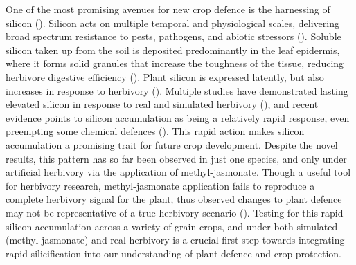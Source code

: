 \documentclass[12pt, letterpaper, ]{report}
\begin{document}
One of the most promising avenues for new crop defence is the harnessing of silicon (\cite{reynolds_silicon_2016}). Silicon acts on multiple temporal and physiological scales, delivering broad spectrum resistance to pests, pathogens, and abiotic stressors (\cite{cooke_consistent_2016,coskun_controversies_2019}). Soluble silicon taken up from the soil is deposited predominantly in the leaf epidermis, where it forms solid granules that increase the toughness of the tissue, reducing herbivore digestive efficiency (\cite{cooke_is_2011}). Plant silicon is expressed latently, but also increases in response to herbivory (\cite{takahashi_possibility_1990, }). Multiple studies have demonstrated lasting elevated silicon in response to real and simulated herbivory (\cite{massey_are_2008,hartley_ecology_2016}), and recent evidence points to silicon accumulation as being a relatively rapid response, even preempting some chemical defences (\cite{waterman_short-term_2021}). This rapid action makes silicon accumulation a promising trait for future crop development. Despite the novel results, this pattern has so far been observed in just one species, and only under artificial herbivory via the application of methyl-jasmonate. Though a useful tool for herbivory research, methyl-jasmonate application fails to reproduce a complete herbivory signal for the plant, thus observed changes to plant defence may not be representative of a true herbivory scenario (\cite{strauss_direct_2002}). Testing for this rapid silicon accumulation across a variety of grain crops, and under both simulated (methyl-jasmonate) and real herbivory is a crucial first step towards integrating rapid silicification into our understanding of plant defence and crop protection.
\end{document}
